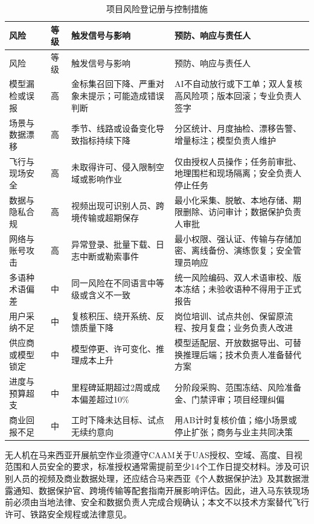 \documentclass[UTF8,a4paper,zihao=-4]{ctexart}
\begin{document}
\begin{longtable}{p{}p{}p{}p{}}
\caption{项目风险登记册与控制措施}\label{tab:risk-register}\\
\toprule
风险 & 等级 & 触发信号与影响 & 预防、响应与责任人 \\
\midrule
\endfirsthead
\toprule
风险 & 等级 & 触发信号与影响 & 预防、响应与责任人 \\
\midrule
\endhead
模型漏检或误报 & 高 & 金标集召回下降、严重对象未提示；可能造成错误判断 & AI不自动放行或下工单；双人复核高风险项；版本回滚；专业负责人签字 \\
场景与数据漂移 & 高 & 季节、线路或设备变化导致指标持续下降 & 分区统计、月度抽检、漂移告警、增量标注；模型负责人维护 \\
飞行与现场安全 & 高 & 未取得许可、侵入限制空域或影响作业 & 仅由授权人员操作；任务前审批、地理围栏和现场隔离；安全负责人停止任务 \\
数据与隐私合规 & 高 & 视频出现可识别人员、跨境传输或超期保存 & 最小化采集、脱敏、本地存储、期限删除、访问审计；数据保护负责人审批 \\
网络与账号攻击 & 高 & 异常登录、批量下载、日志中断或勒索事件 & 最小权限、强认证、传输与存储加密、离线备份、演练恢复；安全管理员响应 \\
多语种术语偏差 & 中 & 同一风险在不同语言中等级或含义不一致 & 统一风险编码、双人术语审校、版本冻结；未验收语种不得用于正式报告 \\
用户采纳不足 & 中 & 复核积压、绕开系统、反馈质量下降 & 岗位培训、试点共创、保留原流程、按月复盘；业务负责人改进 \\
供应商或模型锁定 & 中 & 模型停更、许可变化、推理成本上升 & 模型适配层、开放数据导出、可替换推理后端；技术负责人准备替代方案 \\
进度与预算超支 & 中 & 里程碑延期超过2周或成本偏差超过10\% & 分阶段采购、范围冻结、风险准备金、门禁评审；项目经理纠偏 \\
商业回报不足 & 中 & 工时下降未达目标、试点无续约意向 & 用AB计时复核价值；缩小场景或停止扩张；商务与业主共同决策 \\
\bottomrule
\end{longtable}

无人机在马来西亚开展航空作业须遵守CAAM关于UAS授权、空域、高度、目视范围和人员安全的要求，标准授权通常需提前至少14个工作日提交材料\cite{caam-uas}。涉及可识别人员的视频及商业数据处理，还应结合马来西亚《个人数据保护法》及其数据泄露通知、数据保护官、跨境传输等配套指南开展影响评估\cite{malaysia-pdpa}。因此，进入马东铁现场前必须由当地法律、安全和数据负责人完成合规确认；本文不以技术方案替代飞行许可、铁路安全规程或法律意见。
\end{document}
